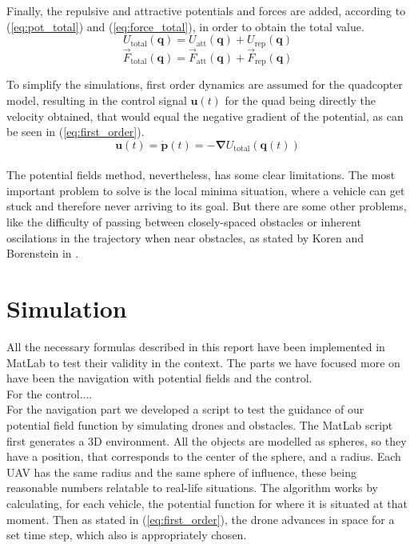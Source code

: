 \documentclass[journal]{IEEEtran}
\newcommand*{\subb}[1]{_{\mathrm{#1}}}
\begin{document}
	Finally, the repulsive and attractive potentials and forces are added, according to (\ref{eq:pot_total}) and (\ref{eq:force_total}), in order to obtain the total value. 
	\begin{equation} \label{eq:pot_total}
	U\subb{total}(\bm{q}) = U\subb{att}(\bm{q}) + U\subb{rep}(\bm{q})
	\end{equation}
	\begin{equation} \label{eq:force_total}
	\vec{F}\subb{total}(\bm{q}) = \vec{F}\subb{att}(\bm{q}) + \vec{F}\subb{rep}(\bm{q})
	\end{equation}
	
	To simplify the simulations, first order dynamics are assumed for the quadcopter model, resulting in the control signal $\bm{u}(t)$ for the quad being directly the velocity obtained, that would equal the negative gradient of the potential, as can be seen in (\ref{eq:first_order}).
	\begin{equation} \label{eq:first_order}
	\bm{u}(t) = \bm{\dot p}(t) = -\bm{\nabla}U\subb{total}(\bm{q}(t))
	\end{equation}
	\\
	The potential fields method, nevertheless, has some clear limitations. The most important problem to solve is the local minima situation, where a vehicle can get stuck and therefore never arriving to its goal. But there are some other problems, like the difficulty of passing between closely-spaced obstacles or inherent oscilations in the trajectory when near obstacles, as stated by Koren and Borenstein in \cite{koren_pot_fields_limitations}. 
	
	\section{Simulation}
	All the necessary formulas described in this report have been implemented in MatLab to test their validity in the context. The parts we have focused more on have been the navigation with potential fields and the control.  \\
	
	For the control....\\
	
	For the navigation part we developed a script to test the guidance of our potential field function by simulating drones and obstacles. The MatLab script first generates a 3D environment. All the objects are modelled as spheres, so they have a position, that corresponds to the center of the sphere, and a radius. Each UAV has the same radius and the same sphere of influence, these being reasonable numbers relatable to real-life situations. The algorithm works by calculating, for each vehicle, the potential function for where it is situated at that moment. Then as stated in (\ref{eq:first_order}), the drone advances in space for a set time step, which also is appropriately chosen. \\
	
\end{document}
